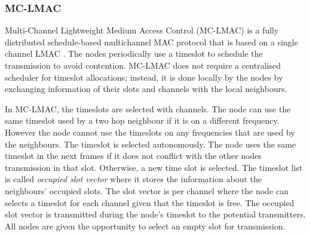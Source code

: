 


\subsubsection{MC-LMAC}
Multi-Channel Lightweight Medium Access Control (MC-LMAC) is a fully distributed schedule-based multichannel MAC protocol that is based on a single channel LMAC \cite{lmac}. The nodes periodically use a timeslot to schedule the transmission to avoid contention. MC-LMAC does not require a centralised scheduler for timeslot allocations; instead, it is done locally by the nodes by exchanging information of their slots and channels with the local neighbours. 

In MC-LMAC, the timeslots are selected with channels. The node can use the same timeslot used by a two hop neighbour if it is on a different frequency. However the node cannot use the timeslots on any frequencies that are used by the neighbours. The timeslot is selected autonomously. The node uses the same timeslot in the next frames if it does not conflict with the other nodes transmission in that slot. Otherwise, a new time slot is selected. The timeslot list is called \textit{occupied slot vector} where it stores the information about the neighbours' occupied slots. The slot vector is per channel where the node can selects a timeslot for each channel given that the timeslot is free.
The occupied slot vector is transmitted during the node's timeslot to the potential transmitters. All nodes are given the opportunity to select an empty slot for transmission.

